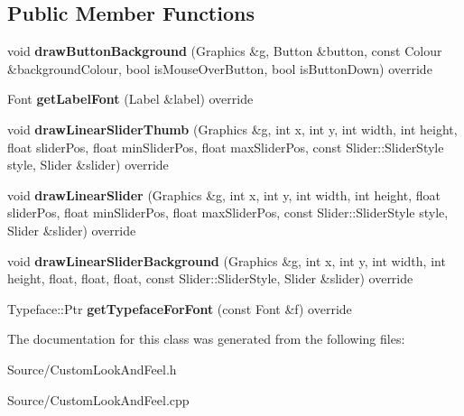 \subsection*{Public Member Functions}
\begin{DoxyCompactItemize}
\item 
\mbox{\label{class_custom_look_and_feel_a23522d65be6a0370625c5aec9e994938}} 
void {\bfseries draw\+Button\+Background} (Graphics \&g, Button \&button, const Colour \&background\+Colour, bool is\+Mouse\+Over\+Button, bool is\+Button\+Down) override
\item 
\mbox{\label{class_custom_look_and_feel_a5a727a54b7f6c009d63c4146cf86bd01}} 
Font {\bfseries get\+Label\+Font} (Label \&label) override
\item 
\mbox{\label{class_custom_look_and_feel_a857c7660bad3d8cde062f5c974fa6120}} 
void {\bfseries draw\+Linear\+Slider\+Thumb} (Graphics \&g, int x, int y, int width, int height, float slider\+Pos, float min\+Slider\+Pos, float max\+Slider\+Pos, const Slider\+::\+Slider\+Style style, Slider \&slider) override
\item 
\mbox{\label{class_custom_look_and_feel_a8e24d0037dea4d3a072cf56b9d6735a6}} 
void {\bfseries draw\+Linear\+Slider} (Graphics \&g, int x, int y, int width, int height, float slider\+Pos, float min\+Slider\+Pos, float max\+Slider\+Pos, const Slider\+::\+Slider\+Style style, Slider \&slider) override
\item 
\mbox{\label{class_custom_look_and_feel_a5c308c242e40dfd88d50421e680d9f80}} 
void {\bfseries draw\+Linear\+Slider\+Background} (Graphics \&g, int x, int y, int width, int height, float, float, float, const Slider\+::\+Slider\+Style, Slider \&slider) override
\item 
\mbox{\label{class_custom_look_and_feel_a0016ad6d559f63a406ea7ace3d1e6dfd}} 
Typeface\+::\+Ptr {\bfseries get\+Typeface\+For\+Font} (const Font \&f) override
\end{DoxyCompactItemize}


The documentation for this class was generated from the following files\+:\begin{DoxyCompactItemize}
\item 
Source/Custom\+Look\+And\+Feel.\+h\item 
Source/Custom\+Look\+And\+Feel.\+cpp\end{DoxyCompactItemize}
